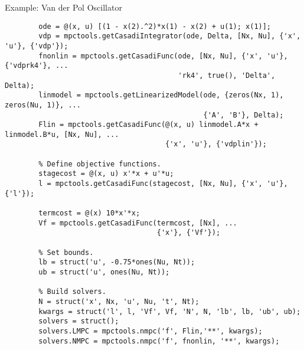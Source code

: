 \documentclass[xcolor=dvipsnames,handout]{beamer}
\begin{document}
\begin{frame}[fragile]{Example: Van der Pol Oscillator}
    
    \vspace{-2em}
    
    \begin{lstlisting}[gobble=8,basicstyle=\ttfamily\fontsize{6}{8}\selectfont]
        % Define nonlinear and linearized models.
        ode = @(x, u) [(1 - x(2).^2)*x(1) - x(2) + u(1); x(1)];
        vdp = mpctools.getCasadiIntegrator(ode, Delta, [Nx, Nu], {'x', 'u'}, {'vdp'});
        fnonlin = mpctools.getCasadiFunc(ode, [Nx, Nu], {'x', 'u'}, {'vdprk4'}, ...
                                         'rk4', true(), 'Delta', Delta);
        linmodel = mpctools.getLinearizedModel(ode, {zeros(Nx, 1), zeros(Nu, 1)}, ...
                                               {'A', 'B'}, Delta);
        Flin = mpctools.getCasadiFunc(@(x, u) linmodel.A*x + linmodel.B*u, [Nx, Nu], ...
                                      {'x', 'u'}, {'vdplin'});
        
        % Define objective functions.
        stagecost = @(x, u) x'*x + u'*u;
        l = mpctools.getCasadiFunc(stagecost, [Nx, Nu], {'x', 'u'}, {'l'});
        
        termcost = @(x) 10*x'*x;
        Vf = mpctools.getCasadiFunc(termcost, [Nx], ...
                                    {'x'}, {'Vf'});
        
        % Set bounds.
        lb = struct('u', -0.75*ones(Nu, Nt));
        ub = struct('u', ones(Nu, Nt));
        
        % Build solvers.
        N = struct('x', Nx, 'u', Nu, 't', Nt);
        kwargs = struct('l', l, 'Vf', Vf, 'N', N, 'lb', lb, 'ub', ub);
        solvers = struct();
        solvers.LMPC = mpctools.nmpc('f', Flin,'**', kwargs);
        solvers.NMPC = mpctools.nmpc('f', fnonlin, '**', kwargs);
    \end{lstlisting}
\end{frame}
\end{document}
